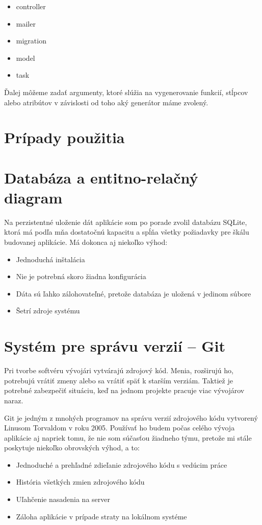 \begin{itemize}
  \item controller
  \item mailer
  \item migration
  \item model
  \item task
\end{itemize}

Ďalej môžeme zadať argumenty, ktoré slúžia na vygenerovanie funkcií, stĺpcov alebo atribútov v závislosti od toho aký generátor máme zvolený.


\section{Prípady použitia}



\section{Databáza a entitno-relačný diagram}

Na perzistentné uloženie dát aplikácie som po porade zvolil databázu SQLite, ktorá má podľa mňa dostatočnú kapacitu a spĺňa všetky požiadavky pre škálu budovanej aplikácie. Má dokonca aj niekoľko výhod:

\begin{itemize}
    \item Jednoduchá inštalácia
    \item Nie je potrebná skoro žiadna konfigurácia
    \item Dáta sú ľahko zálohovateľné, pretože databáza je uložená v jedinom súbore
    \item Šetrí zdroje systému
\end{itemize}

\section{Systém pre správu verzií -- Git}

Pri tvorbe softvéru vývojári vytvárajú zdrojový kód. Menia, rozširujú ho, potrebujú vrátiť zmeny alebo sa vrátiť späť k starším verziám. Taktiež je potrebné zabezpečiť situáciu, keď na jednom projekte pracuje viac vývojárov naraz. \citep{otte2009version} 

Git je jedným z mnohých programov na správu verzií zdrojového kódu vytvorený Linusom Torvaldom v roku 2005. Používať ho budem počas celého vývoja aplikácie aj napriek tomu, že nie som súčasťou žiadneho týmu, pretože mi stále poskytuje niekoľko obrovských výhod, a to: 

\begin{itemize}
    \item Jednoduché a prehľadné zdieľanie zdrojového kódu s vedúcim práce
    \item História všetkých zmien zdrojového kódu
    \item Uľahčenie nasadenia na server
    \item Záloha aplikácie v prípade straty na lokálnom systéme
\end{itemize}